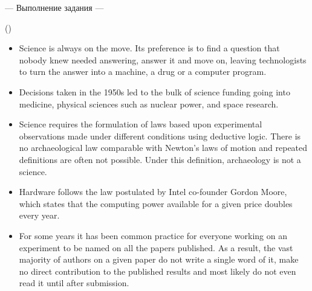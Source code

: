 \documentclass[main.tex]{subfiles}
\begin{document}
\newpage
{}

\hypertarget{ltask:2024-04-10-2}{--- Выполнение задания ---} (\hyperref[task:2024-04-10-2]{\color{blue}{перейти к тексту задания}})
\\

\vspace{5pt}
\begin{itemize}[nosep, leftmargin=*]
	\itemsep10pt
	\item Science is always on the move. Its preference is to find a question that nobody knew needed answering, answer it and move on, leaving technologists to turn the answer into a machine, a drug or a computer program.
	\item Decisions taken in the 1950s led to the bulk of science funding going into medicine, physical sciences such as nuclear power, and space research.
	\item Science requires the formulation of laws based upon experimental observations made under different conditions using deductive logic. There is no archaeological law comparable with Newton's laws of motion and repeated definitions are often not possible. Under this definition, archaeology is not a science.
	\item Hardware follows the law postulated by Intel co-founder Gordon Moore, which states that the computing power available for a given price doubles every year.
	\item For some years it has been common practice for everyone working on an experiment to be named on all the papers published. As a result, the vast majority of authors on a given paper do not write a single word of it, make no direct contribution to the published results and most likely do not even read it until after submission.
\end{itemize}
\end{document}
